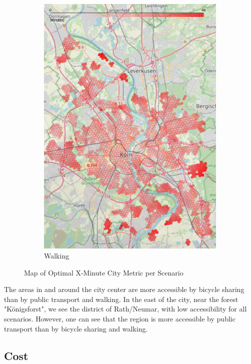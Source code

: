 \begin{figure}
\begin{subfigure}[b]{0.3\textwidth}
         \includegraphics[width=\textwidth]{Figures/results/minute_city_metric/walking_optimal_map}
         \caption{Walking}
         \label{fig:walking_optimal_map}
     \end{subfigure}
        \caption{Map of Optimal X-Minute City Metric per Scenario}
        \label{fig:optimal_map_per_scenario}
\end{figure}
The areas in and around the city center are more accessible by bicycle sharing than by public transport and walking.
In the east of the city, near the forest "Königsforst", we see the district of Rath/Neumar, with low accessibility for all scenarios.
However, one can see that the region is more accessible by public transport than by bicycle sharing and walking.

\subsection{Cost}
\label{subsec:cost_of_15_minute_city}

